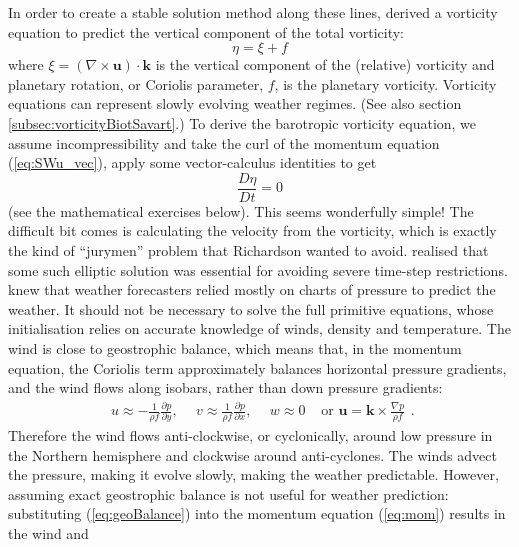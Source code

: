 In order to create a stable solution method along these lines, \citet{Char48}
derived a vorticity equation to predict the vertical component of
the total vorticity:
\begin{equation}
\eta=\xi+f\label{eq:pv}
\end{equation}
where $\xi=\left(\nabla\times\mathbf{u}\right)\cdot\mathbf{k}$ is
the vertical component of the (relative) vorticity and planetary rotation,
or Coriolis parameter, $f$, is the planetary vorticity. Vorticity
equations can represent slowly evolving weather regimes. (See also section \ref{subsec:vorticityBiotSavart}.)
To derive the barotropic vorticity equation, we assume incompressibility
and take the curl of the momentum equation (\ref{eq:SWu_vec}), apply
some vector-calculus identities to get
\begin{equation}
\frac{D\eta}{Dt}=0\label{eq:baroVortEqn}
\end{equation}
(see the mathematical exercises below). This seems wonderfully simple!
The difficult bit comes is calculating the velocity from the vorticity,
which is exactly the kind of ``jurymen'' problem that Richardson
wanted to avoid. \citet{Char48} realised that some such elliptic
solution was essential for avoiding severe time-step restrictions.
\citet{Char49} knew that weather forecasters relied mostly on charts
of pressure to predict the weather. It should not be necessary to
solve the full primitive equations, whose initialisation relies on
accurate knowledge of winds, density and temperature. The wind is
close to geostrophic balance, which means that, in the momentum equation,
the Coriolis term approximately balances horizontal pressure gradients,
and the wind flows along isobars, rather than down pressure gradients:
\begin{equation}
\begin{array}{cccc}
u\approx-\frac{1}{\rho f}\frac{\partial p}{\partial y},\ \  & v\approx\frac{1}{\rho f}\frac{\partial p}{\partial x},\ \  & w\approx0 & \text{ or }\mathbf{u}=\mathbf{k}\times\frac{\nabla p}{\rho f}\end{array}.\label{eq:geoBalance}
\end{equation}
Therefore the wind flows anti-clockwise, or cyclonically, around low
pressure in the Northern hemisphere and clockwise around anti-cyclones.
The winds advect the pressure, making it evolve slowly, making the
weather predictable. However, assuming exact geostrophic balance is
not useful for weather prediction: substituting (\ref{eq:geoBalance})
into the momentum equation (\ref{eq:mom}) results in the wind and
